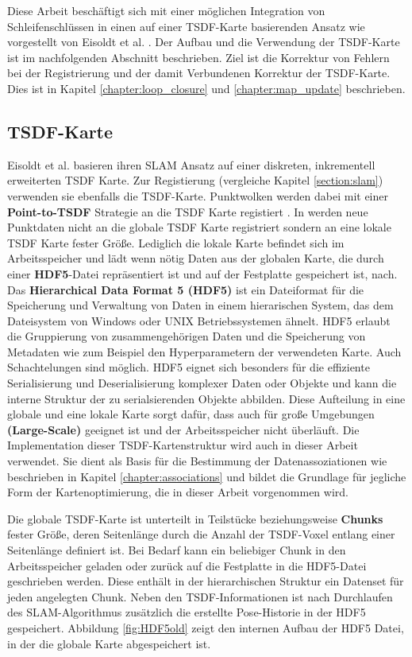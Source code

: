 Diese Arbeit beschäftigt sich mit einer möglichen Integration von Schleifenschlüssen in einen auf einer TSDF-Karte basierenden Ansatz wie vorgestellt von Eisoldt et al. \cite{HATSDF}. Der Aufbau und die Verwendung der TSDF-Karte ist im nachfolgenden Abschnitt beschrieben. Ziel ist die Korrektur von Fehlern bei der Registrierung und der damit Verbundenen Korrektur der TSDF-Karte. Dies ist in Kapitel \ref{chapter:loop_closure} und \ref{chapter:map_update} beschrieben.

\subsection{TSDF-Karte}
\label{section:tsdf_map}

Eisoldt et al. \cite{HATSDF} basieren ihren SLAM Ansatz auf einer diskreten, inkrementell erweiterten TSDF Karte. Zur Registierung (vergleiche Kapitel \ref{section:slam}) verwenden sie ebenfalls die TSDF-Karte. Punktwolken werden dabei mit einer \textbf{Point-to-TSDF} Strategie an die TSDF Karte registiert \cite{HATSDF}.
In \cite{HATSDF} werden neue Punktdaten nicht an die globale TSDF Karte registriert sondern an eine lokale TSDF Karte fester Größe. Lediglich die lokale Karte befindet sich im Arbeitsspeicher und lädt wenn nötig Daten aus der globalen Karte, die durch einer \textbf{HDF5}-Datei repräsentiert ist und auf der Festplatte gespeichert ist, nach. Das \textbf{Hierarchical Data Format 5 (HDF5)} \cite{hdf5} ist ein Dateiformat für die Speicherung und Verwaltung von Daten in einem hierarischen System, das dem Dateisystem von Windows oder UNIX Betriebssystemen ähnelt. HDF5 erlaubt die Gruppierung von zusammengehörigen Daten und die Speicherung von Metadaten wie zum Beispiel den Hyperparametern der verwendeten Karte. Auch Schachtelungen sind möglich. HDF5 eignet sich besonders für die effiziente Serialisierung und Deserialisierung komplexer Daten oder Objekte und kann die interne Struktur der zu serialsierenden Objekte abbilden.
Diese Aufteilung in eine globale und eine lokale Karte sorgt dafür, dass \cite{HATSDF} auch für große Umgebungen \textbf{(Large-Scale)} geeignet ist und der Arbeitsspeicher nicht überläuft. Die Implementation dieser TSDF-Kartenstruktur wird auch in dieser Arbeit verwendet. Sie dient als Basis für die Bestimmung der Datenassoziationen wie beschrieben in Kapitel \ref{chapter:associations} und bildet die Grundlage für jegliche Form der Kartenoptimierung, die in dieser Arbeit vorgenommen wird.

Die globale TSDF-Karte ist unterteilt in Teilstücke beziehungsweise \textbf{Chunks} fester Größe, deren Seitenlänge durch die Anzahl der TSDF-Voxel entlang einer Seitenlänge definiert ist. Bei Bedarf kann ein beliebiger Chunk in den Arbeitsspeicher geladen oder zurück auf die Festplatte in die HDF5-Datei geschrieben werden. Diese enthält in der hierarchischen Struktur ein Datenset für jeden angelegten Chunk. Neben den TSDF-Informationen ist nach Durchlaufen des SLAM-Algorithmus zusätzlich die erstellte Pose-Historie in der HDF5 gespeichert.
Abbildung \ref{fig:HDF5old} zeigt den internen Aufbau der HDF5 Datei, in der die globale Karte abgespeichert ist.

